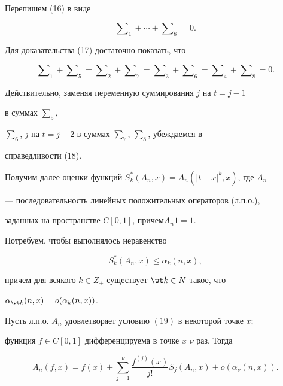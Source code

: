 \begin{pf}
Перепишем (16) в виде 


\begin{equation} 


\sum\nolimits_1+\dotsb+\sum\nolimits_8=0. 


\end{equation} 


Для доказательства (17) достаточно показать, что 


\begin{equation} 


\sum\nolimits_1+\sum\nolimits_5= 


\sum\nolimits_2+\sum\nolimits_7= 


\sum\nolimits_3+\sum\nolimits_6= 


\sum\nolimits_4+\sum\nolimits_8=0. 


\end{equation} 


Действительно, заменяя переменную суммирования $j$ на $t=j-1$ 


в суммах $\sum_5$, 


$\sum_6$, $j$ на $t=j-2$ в суммах $\sum_7$, $\sum_8$, убеждаемся в 


справедливости (18). 


\end{pf} 


 


Получим далее оценки функций $S^*_k(A_n,x)=A_n(|t-x|^k,x)$, где $A_n$ 


--- последовательность линейных положительных операторов (л.п.о.), 


заданных на пространстве $C[0,1]$, причем\linebreak $A_n1=1$. 


 


Потребуем, чтобы выполнялось неравенство 


\begin{equation} 


S^*_k(A_n,x)\le\alpha_k(n,x), 


\end{equation} 


причем для всякого $k\in Z_+$ существует $\wt k\in N$ такое, что 


$\alpha_{\wt k}(n,x)=o(\alpha_k(n,x))$. 


 


\begin{lem} 


Пусть л.п.о. $A_n$ удовлетворяет условию $(19)$ в некоторой точке $x;$ 


функция $f\in C[0,1]$ дифференцируема в точке $x$\; $\nu$ раз. Тогда 


\begin{equation} 


A_n(f,x)=f(x)+\sum^\nu_{j=1}\frac{f^{(j)}(x)}{j!} 


S_j(A_n,x)+o(\alpha_\nu(n,x)). 


\end{equation} 


\end{lem} 


